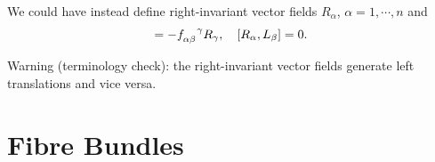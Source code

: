 \documentclass[a4paper,11pt]{article}
\begin{document}
    \begin{nt}
        We could have instead define right-invariant vector fields $R_\alpha$, $\alpha=1,\cdots,n$ and 
        \begin{equation}
            [R_\alpha, R_\beta] = - f\indices{_{\alpha \beta}^\gamma}R_\gamma, \quad [R_\alpha, L_\beta] = 0.
        \end{equation}

        Warning (terminology check): the right-invariant vector fields generate left translations and vice versa.
    \end{nt}

    \newpage
    \section{Fibre Bundles}
\end{document}
